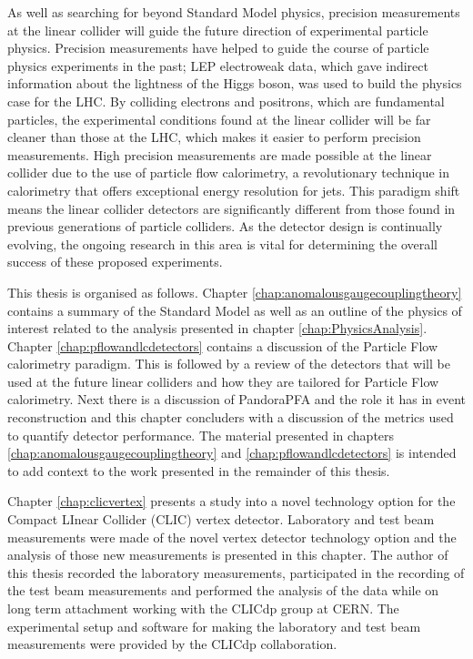 As well as searching for beyond Standard Model physics, precision measurements at the linear collider will guide the future direction of experimental particle physics.  Precision measurements have helped to guide the course of particle physics experiments in the past; LEP electroweak data, which gave indirect information about the lightness of the Higgs boson, was used to build the physics case for the LHC.  By colliding electrons and positrons, which are fundamental particles, the experimental conditions found at the linear collider will be far cleaner than those at the LHC, which makes it easier to perform precision measurements.  High precision measurements are made possible at the linear collider due to the use of particle flow calorimetry, a revolutionary technique in calorimetry that offers exceptional energy resolution for jets.  This paradigm shift means the linear collider detectors are significantly different from those found in previous generations of particle colliders.  As the detector design is continually evolving, the ongoing research in this area is vital for determining the overall success of these proposed experiments.  

This thesis is organised as follows.  Chapter \ref{chap:anomalousgaugecouplingtheory} contains a summary of the Standard Model as well as an outline of the physics of interest related to the analysis presented in chapter \ref{chap:PhysicsAnalysis}.  {Chapter \ref{chap:pflowandlcdetectors} contains a discussion of the Particle Flow calorimetry paradigm.  This is followed by a review of the detectors that will be used at the future linear colliders and how they are tailored for Particle Flow calorimetry.  Next there is a discussion of PandoraPFA and the role it has in event reconstruction and this chapter concluders with a discussion of the metrics used to quantify detector performance.  The material presented in chapters \ref{chap:anomalousgaugecouplingtheory} and \ref{chap:pflowandlcdetectors} is intended to add context to the work presented in the remainder of this thesis.}

Chapter \ref{chap:clicvertex} presents a study into a novel technology option for the Compact LInear Collider (CLIC) vertex detector.  Laboratory and test beam measurements were made of the novel vertex detector technology option and the analysis of those new measurements is presented in this chapter.  The author of this thesis recorded the laboratory measurements, participated in the recording of the test beam measurements and performed the analysis of the data while on long term attachment working with the CLICdp group at CERN.  The experimental setup and software for making the laboratory and test beam measurements were provided by the CLICdp collaboration.

